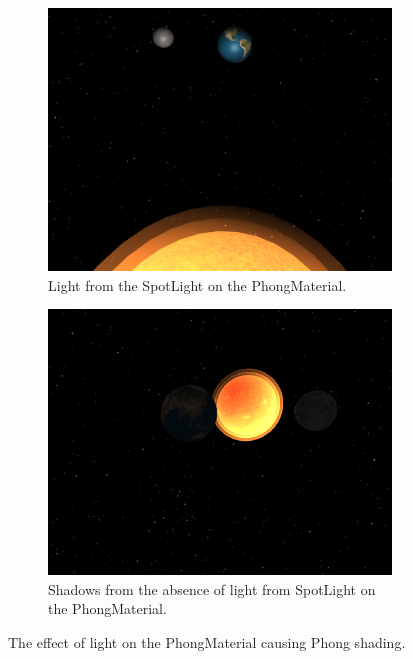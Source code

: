 \documentclass[12pt]{article}
\begin{document}
 \begin{figure}[H]
        \centering
        \begin{subfigure}[b]{0.4\textwidth}
                \includegraphics[width=\textwidth]{images/lightfromphong1}
                \caption{Light from the SpotLight on the PhongMaterial.}
                \label{fig: Light from the SpotLight on the PhongMaterial.}
	 \end{subfigure}
        \begin{subfigure}[b]{0.4\textwidth}
                \includegraphics[width=\textwidth]{images/lightfromphong2}
                \caption{Shadows from the absence of light from SpotLight on the PhongMaterial.}
                \label{fig: Shadows from the absence of light from SpotLight on the PhongMateria.}
	 \end{subfigure}
	 \caption{The effect of light on the PhongMaterial causing Phong shading.}
\end{figure}
\end{document}
